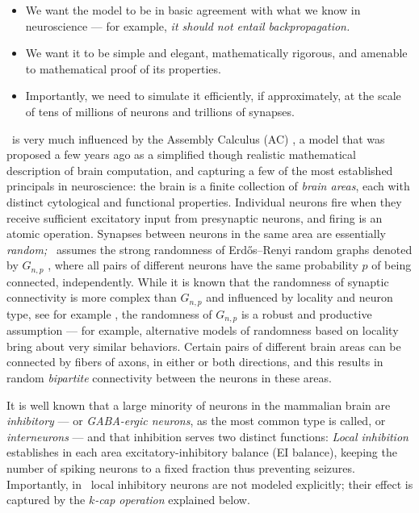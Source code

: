 \documentclass{article}
\begin{document}
\begin{itemize}
    \item We want the model to be in basic agreement with what we know in neuroscience --- for example, \emph{it should not entail backpropagation.}
    \item We want it to be simple and elegant, mathematically rigorous, and amenable to mathematical proof of its properties.  
    \item Importantly, we need to simulate it efficiently, if approximately, at the scale of tens of millions of neurons and trillions of synapses. 
\end{itemize}
\name\  is very much influenced by the Assembly Calculus (AC) \citep{PNAS}, a model that was proposed a few years ago as a simplified though realistic mathematical description of brain computation, and capturing a few of the most established principals in neuroscience:  the brain is a finite collection of \emph{brain areas}, each with distinct cytological and functional properties. Individual neurons fire when they receive sufficient excitatory input from presynaptic neurons, and firing is an atomic operation.  Synapses between neurons in the same area are essentially \emph{random;} \name\ assumes the strong randomness of Erd\H os--Renyi random graphs denoted by $G_{n,p}$ \citep{Erdos60}, where all pairs of different neurons have the same probability $p$ of being connected, independently. While it is known that the randomness of synaptic connectivity is more complex than $G_{n,p}$ and influenced by locality and neuron type, see for example \citet{nonrandom}, the randomness of $G_{n,p}$ is a robust and productive assumption --- for example, alternative models of randomness based on locality bring about very similar behaviors.  Certain pairs of different brain areas can be connected by fibers of axons, in either or both directions, and this results in random \emph{bipartite} connectivity between the neurons in these areas.  

It is well known that a large minority of neurons in the mammalian brain are \emph{inhibitory} --- or \emph{GABA-ergic neurons}, as the most common type is called, or \emph{interneurons} --- and that inhibition serves two distinct functions:  \emph{Local inhibition} establishes in each area excitatory-inhibitory balance (EI balance), keeping the number of spiking neurons to a fixed fraction thus preventing seizures. Importantly, in \name\  local inhibitory neurons are not modeled explicitly; their effect is captured by the \emph{$k$-cap operation} explained below.
\end{document}
